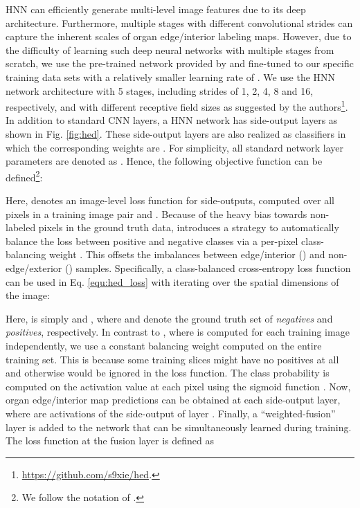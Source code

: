 \documentclass[journal]{IEEEtran}
\begin{document}
HNN can efficiently generate multi-level image features due to its deep architecture. Furthermore, multiple stages with different convolutional strides can capture the inherent scales of organ edge/interior labeling maps. However, due to the difficulty of learning such deep neural networks with multiple stages from scratch, we use the pre-trained network provided by \cite{xie2015holistically} and fine-tuned to our specific training data sets  with a relatively smaller learning rate of . We use the HNN network architecture with 5 stages, including strides of 1, 2, 4, 8 and 16, respectively, and with different receptive field sizes as suggested by the authors\footnote{\scriptsize\url{https://github.com/s9xie/hed}.}.
In addition to standard CNN layers, a HNN network has  side-output layers as shown in Fig. \ref{fig:hed}. These side-output layers are also realized as classifiers in which the corresponding weights are . For simplicity, all standard network layer parameters are denoted as . Hence, the following objective function can be defined\footnote{\scriptsize We follow the notation of \cite{xie2015holistically}.}:

Here,  denotes an image-level loss function for side-outputs, computed over all pixels in a training image pair  and . Because of the heavy bias towards non-labeled pixels in the ground truth data, \cite{xie2015holistically} introduces a strategy to automatically balance the loss between positive and negative classes via a per-pixel class-balancing weight . This offsets the imbalances between edge/interior () and non-edge/exterior () samples. Specifically, a class-balanced cross-entropy loss function can be used in Eq. \eqref{equ:hed_loss} with  iterating over the spatial dimensions of the image:

Here,  is simply  and , where  and  denote the ground truth set of \textit{negatives} and \textit{positives}, respectively. In contrast to \cite{xie2015holistically}, where  is computed for each training image independently, we use a constant balancing weight computed on the entire training set. This is because some training slices might have no positives at all and otherwise would be ignored in the loss function. The class probability  is computed on the activation value at each pixel  using the sigmoid function . Now, organ edge/interior map predictions  can be obtained at each side-output layer, where  are activations of the side-output of layer . Finally, a ``weighted-fusion'' layer is added to the network that can be simultaneously learned during training. The loss function at the fusion layer  is defined as
\end{document}
